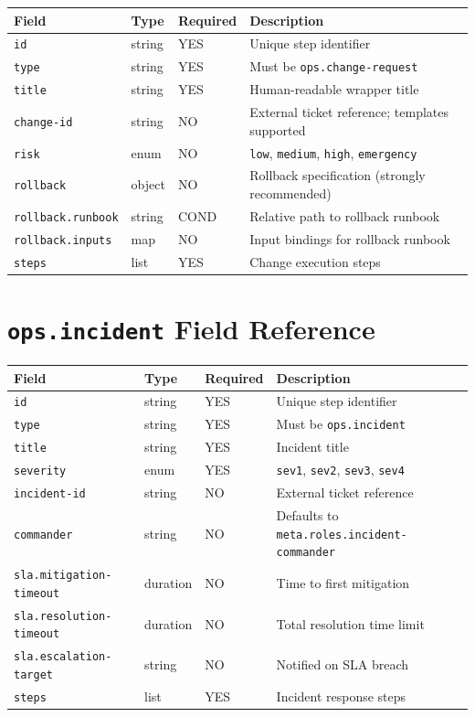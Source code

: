 \begin{center}
\small
\begin{tabular}{lllp{5cm}}
\textbf{Field} & \textbf{Type} & \textbf{Required} & \textbf{Description} \\
\hline
\texttt{id} & string & YES & Unique step identifier \\
\texttt{type} & string & YES & Must be \texttt{ops.change-request} \\
\texttt{title} & string & YES & Human-readable wrapper title \\
\texttt{change-id} & string & NO & External ticket reference; templates supported \\
\texttt{risk} & enum & NO & \texttt{low}, \texttt{medium}, \texttt{high}, \texttt{emergency} \\
\texttt{rollback} & object & NO & Rollback specification (strongly recommended) \\
\texttt{rollback.runbook} & string & COND & Relative path to rollback runbook \\
\texttt{rollback.inputs} & map & NO & Input bindings for rollback runbook \\
\texttt{steps} & list & YES & Change execution steps \\
\end{tabular}
\end{center}

\section{\texttt{ops.incident} Field Reference}
\label{sec:ref-ops-incident}

\begin{center}
\small
\begin{tabular}{lllp{5cm}}
\textbf{Field} & \textbf{Type} & \textbf{Required} & \textbf{Description} \\
\hline
\texttt{id} & string & YES & Unique step identifier \\
\texttt{type} & string & YES & Must be \texttt{ops.incident} \\
\texttt{title} & string & YES & Incident title \\
\texttt{severity} & enum & YES & \texttt{sev1}, \texttt{sev2}, \texttt{sev3}, \texttt{sev4} \\
\texttt{incident-id} & string & NO & External ticket reference \\
\texttt{commander} & string & NO & Defaults to \texttt{meta.roles.incident-commander} \\
\texttt{sla.mitigation-timeout} & duration & NO & Time to first mitigation \\
\texttt{sla.resolution-timeout} & duration & NO & Total resolution time limit \\
\texttt{sla.escalation-target} & string & NO & Notified on SLA breach \\
\texttt{steps} & list & YES & Incident response steps \\
\end{tabular}
\end{center}

